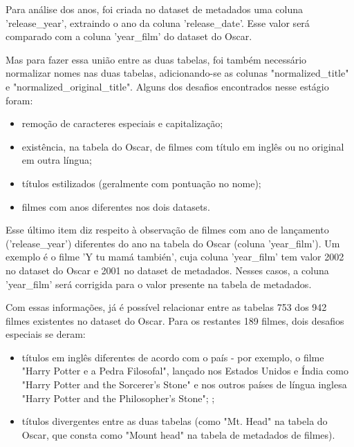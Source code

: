             Para análise dos anos, foi criada no dataset de metadados uma coluna 'release\_year', extraindo o ano da coluna 'release\_date'. Esse valor será comparado com a coluna 'year\_film' do dataset do Oscar.

            Mas para fazer essa união entre as duas tabelas, foi também necessário normalizar nomes nas duas tabelas, adicionando-se as colunas "normalized\_title" e "normalized\_original\_title". Alguns dos desafios encontrados nesse estágio foram:

            \begin{itemize}
                \item remoção de caracteres especiais e capitalização;
                \item existência, na tabela do Oscar, de filmes com título em inglês ou no original em outra língua;
                \item títulos estilizados (geralmente com pontuação no nome);
                \item filmes com anos diferentes nos dois datasets.
            \end{itemize}

            Esse último item diz respeito à observação de filmes com ano de lançamento ('release\_year') diferentes do ano na tabela do Oscar (coluna 'year\_film'). Um exemplo é o filme 'Y tu mamá también', cuja coluna 'year\_film' tem valor 2002 no dataset do Oscar e 2001 no dataset de metadados. Nesses casos, a coluna 'year\_film' será corrigida para o valor presente na tabela de metadados.


            Com essas informações, já é possível relacionar entre as tabelas 753 dos 942 filmes existentes no dataset do Oscar. Para os restantes 189 filmes, dois desafios especiais se deram:\par

            \begin{itemize}
                \item títulos em inglês diferentes de acordo com o país - por exemplo, o filme "Harry Potter e a Pedra Filosofal", lançado nos Estados Unidos e Índia como "Harry Potter and the Sorcerer's Stone" e nos outros países de língua inglesa "Harry Potter and the Philosopher's Stone"; \cite{yahoo2000};\par
                \item títulos divergentes entre as duas tabelas (como "Mt. Head" na tabela do Oscar, que consta como "Mount head" na tabela de metadados de filmes).\par
            \end{itemize}

